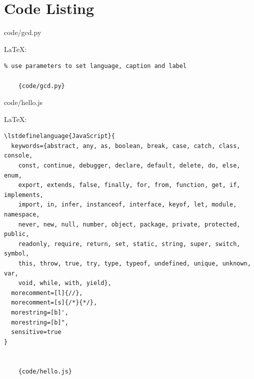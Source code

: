 \documentclass[12pt,nonacm,acmlarge,titlepage,screen]{acmart}
\begin{document}
\section*{Code Listing}


    {code/gcd.py}

\noindent\LaTeX:
\begin{Verbatim}[frame=single]
% import code from gcd.py
% use parameters to set language, caption and label

    {code/gcd.py}
\end{Verbatim}



    {code/hello.js}

\noindent\LaTeX:
\begin{Verbatim}[frame=single]
% adding language to code listing
\lstdefinelanguage{JavaScript}{
  keywords={abstract, any, as, boolean, break, case, catch, class, console, 
    const, continue, debugger, declare, default, delete, do, else, enum, 
    export, extends, false, finally, for, from, function, get, if, implements, 
    import, in, infer, instanceof, interface, keyof, let, module, namespace,
    never, new, null, number, object, package, private, protected, public, 
    readonly, require, return, set, static, string, super, switch, symbol, 
    this, throw, true, try, type, typeof, undefined, unique, unknown, var, 
    void, while, with, yield},
  morecomment=[l]{//},
  morecomment=[s]{/*}{*/},
  morestring=[b]',
  morestring=[b]",
  sensitive=true
}


    {code/hello.js}
\end{Verbatim}
\end{document}
